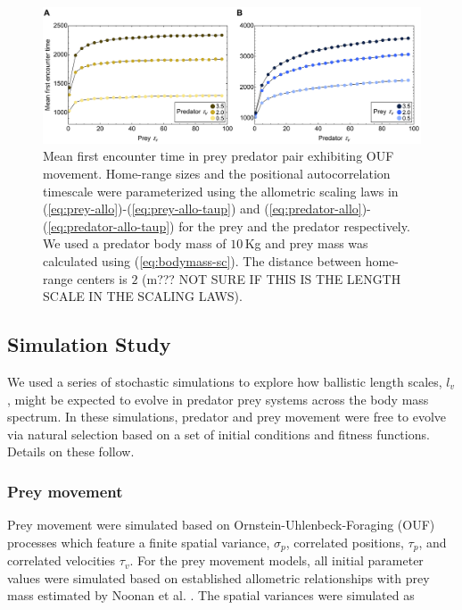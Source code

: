 \documentclass[12pt]{article}
\begin{document}
\begin{figure}[!h]
\centering
\includegraphics[width=\textwidth]{pair-mfet.png}
\caption{Mean first encounter time in prey predator pair exhibiting OUF movement. Home-range sizes and the positional autocorrelation timescale were parameterized using the allometric scaling laws in (\ref{eq:prey-allo})-(\ref{eq:prey-allo-taup}) and (\ref{eq:predator-allo})-(\ref{eq:predator-allo-taup}) for the prey and the predator respectively. We used a predator body mass of $10$\,Kg and prey mass was calculated using (\ref{eq:bodymass-sc}). The distance between home-range centers is $2$ (m??? NOT SURE IF THIS IS THE LENGTH SCALE IN THE SCALING LAWS).}
\label{fig:mfet-pairs}
\end{figure}








\subsection*{Simulation Study}

We used a series of stochastic simulations to explore how ballistic length scales, $l_v$, might be expected to evolve in predator prey systems across the body mass spectrum. In these simulations, predator and prey movement were free to evolve via natural selection based on a set of initial conditions and fitness functions. Details on these follow.

\subsubsection*{Prey movement}

Prey movement were simulated based on Ornstein-Uhlenbeck-Foraging (OUF) processes \cite{Fleming:2014jr,Fleming:2014gd} which feature a finite spatial variance, $\sigma_p$, correlated positions, $\tau_p$, and correlated velocities $\tau_v$. For the prey movement models, all initial parameter values were simulated based on established allometric relationships with prey mass estimated by Noonan et al. \cite{Noonan:2020}. The spatial variances were simulated as
\end{document}
